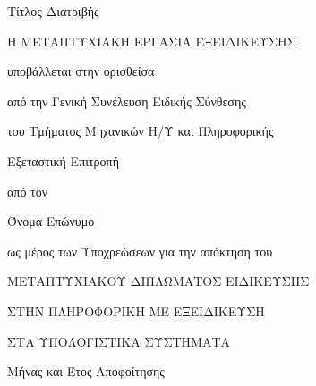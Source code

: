 \begin{center}
	{\LARGE Τίτλος Διατριβής}
	\par
	\vspace{2.5cm} {\Large Η ΜΕΤΑΠΤΥΧΙΑΚΗ ΕΡΓΑΣΙΑ ΕΞΕΙΔΙΚΕΥΣΗΣ}
	
	\vspace{1.25cm} {\Large υποβάλλεται στην ορισθείσα}
	
	\vspace{0.75cm} {\Large από την Γενική Συνέλευση Ειδικής Σύνθεσης}
	
	\vspace{0.25cm} {\Large του Τμήματος Μηχανικών Η/Υ και Πληροφορικής}
	
	\vspace{0.25cm} {\Large Εξεταστική Επιτροπή}
	
	\vspace{1.25cm} {\Large από τον}
	
	\vspace{1.75cm} {\LARGE Όνομα Επώνυμο}
	
	\vspace{1.25cm} {\Large ως μέρος των Υποχρεώσεων για την απόκτηση του}
	
	\vspace{1.75cm} {\Large ΜΕΤΑΠΤΥΧΙΑΚΟΥ ΔΙΠΛΩΜΑΤΟΣ ΕΙΔΙΚΕΥΣΗΣ}
	
	\vspace{0.5cm} {\Large ΣΤΗΝ ΠΛΗΡΟΦΟΡΙΚΗ ΜΕ ΕΞΕΙΔΙΚΕΥΣΗ}
	
	\vspace{0.5cm} {\Large ΣΤΑ ΥΠΟΛΟΓΙΣΤΙΚΑ ΣΥΣΤΗΜΑΤΑ}
	\par
	\vfill {\Large Μήνας και Έτος Αποφοίτησης}
\end{center}

\newpage
\thispagestyle{empty}


